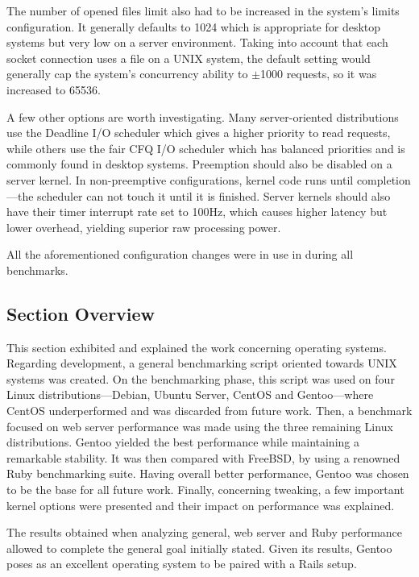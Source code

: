 The number of opened files limit also had to be increased in the system's limits configuration. It generally defaults to 1024 which is appropriate for desktop systems but very low on a server environment. Taking into account that each socket connection uses a file on a UNIX system, the default setting would generally cap the system's concurrency ability to $\pm$1000 requests, so it was increased to 65536.

A few other options are worth investigating. Many server-oriented distributions use the Deadline I/O scheduler which gives a higher priority to read requests, while others use the fair CFQ I/O scheduler which has balanced priorities and is commonly found in desktop systems. Preemption should also be disabled on a server kernel. In non-preemptive configurations, kernel code runs until completion---the scheduler can not touch it until it is finished. Server kernels should also have their timer interrupt rate set to 100Hz, which causes higher latency but lower overhead, yielding superior raw processing power.

All the aforementioned configuration changes were in use in during all benchmarks.


\subsection{Section Overview}
This section exhibited and explained the work concerning operating systems. Regarding development, a general benchmarking script oriented towards UNIX systems was created. On the benchmarking phase, this script was used on four Linux distributions---Debian, Ubuntu Server, CentOS and Gentoo---where CentOS underperformed and was discarded from future work. Then, a benchmark focused on web server performance was made using the three remaining Linux distributions. Gentoo yielded the best performance while maintaining a remarkable stability. It was then compared with FreeBSD, by using a renowned Ruby benchmarking suite. Having overall better performance, Gentoo was chosen to be the base for all future work. Finally, concerning tweaking, a few important kernel options were presented and their impact on performance was explained.

The results obtained when analyzing general, web server and Ruby performance allowed to complete the general goal initially stated. Given its results, Gentoo poses as an excellent operating system to be paired with a Rails setup.
